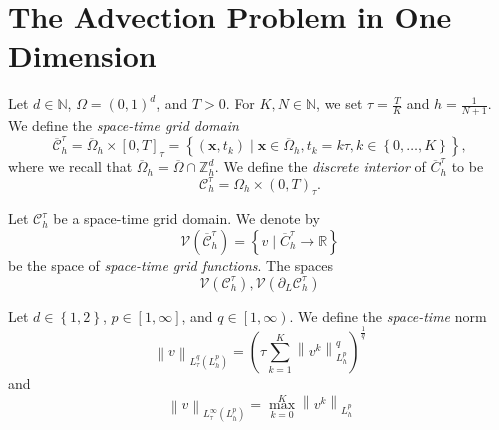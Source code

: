 \section{The Advection Problem in One Dimension}

\begin{frame}
	\begin{definition}
		Let $d\in\mathbb{N}$, $\Omega=\left(0,1\right)^{d}$, and $T>0$.
		For $K, N\in\mathbb{N}$, we set $\tau=\frac{T}{K}$ and
		$h=\frac{1}{N+1}$.
		We define the \emph{space-time grid domain}
		\begin{equation*}
			\overline{\mathcal{C}}^{\tau}_{h}=
			\overline{\Omega}_{h}\times
			{\left[0,T\right]}_{\tau}=
			\left\{
			\left(\mathbf{x},t_{k}\right)\mid
			\mathbf{x}\in\overline{\Omega}_{h},
			t_{k}=k\tau,
			k\in\left\{0,\dotsc,K\right\}
			\right\},
		\end{equation*}
		where we recall that
		\begin{math}
			\overline{\Omega}_{h}=
			\overline{\Omega}\cap
			\mathbb{Z}^{d}_{h}
		\end{math}.
		We define the \emph{discrete interior} of $\overline{C}^{\tau}_{h}$ to be
		\begin{equation*}
			\mathcal{C}^{\tau}_{h}=\Omega_{h}\times
			\left(0,T\right)_{\tau}.
		\end{equation*}
	\end{definition}

	\begin{definition}
		Let $\mathcal{C}^{\tau}_{h}$ be a space-time grid domain.
		We denote by
		\begin{equation*}
			\mathcal{V}
			\left(
			\overline{\mathcal{C}}^{\tau}_{h}
			\right)=
			\left\{
			v\mid
			\overline{C}^{\tau}_{h}\to\mathbb{R}
			\right\}
		\end{equation*}
		be the space of \emph{space-time grid functions}.
		The spaces
		\begin{equation*}
			\mathcal{V}
			\left(
			\mathcal{C}^{\tau}_{h}
			\right),
			\mathcal{V}
			\left(
			\partial_{L}\mathcal{C}^{\tau}_{h}
			\right)
		\end{equation*}
	\end{definition}
\end{frame}

\begin{frame}
	\begin{definition}
		Let $d\in\left\{1,2\right\}$, $p\in\left[1,\infty\right]$, and
		$q\in\left[1,\infty\right)$.
		We define the \emph{space-time} norm
		\begin{equation*}
			\left\|
			v
			\right\|_{L^{q}_{\tau}\left(L^{p}_{h}\right)}=
				{\left(\tau
					\sum_{k=1}^{K}
					\left\|v^{k}\right\|^{q}_{L^{p}_{h}}
					\right)}^{\frac{1}{q}}
		\end{equation*}
		and
		\begin{equation*}
			\left\|
			v
			\right\|_{L^{\infty}_{\tau}\left(L^{p}_{h}\right)}=
			\max^{K}_{k=0}
			{\left\|
			v^{k}
			\right\|}_{L^{p}_{h}}
		\end{equation*}
	\end{definition}
\end{frame}

